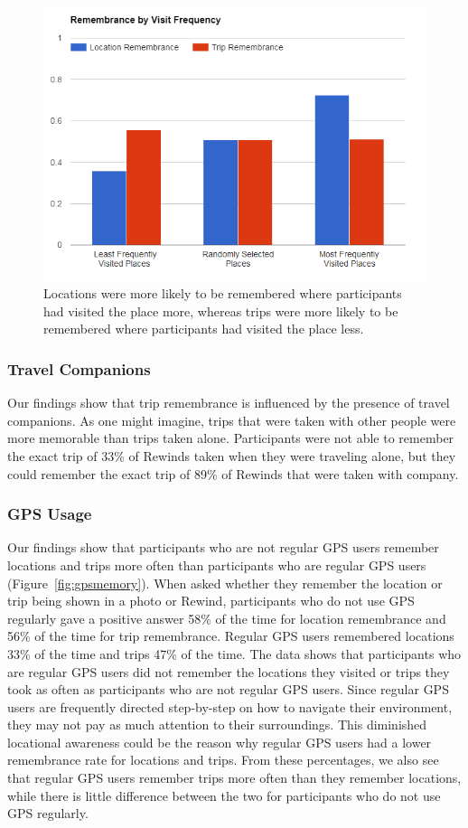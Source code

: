 \documentclass{sigchi}
\begin{document}
\begin{figure}
   \centering
     \includegraphics[width=1\linewidth]{RML_2}
     \caption{Locations were more likely to be remembered where participants had visited the place more, whereas trips were more likely to be remembered where participants had visited the place less.}
     \label{fig:frequencymemory}
\end{figure}

\subsubsection{Travel Companions}
Our findings show that trip remembrance is influenced by the presence of travel companions. As one might imagine, trips that were taken with other people were more memorable than trips taken alone. Participants were not able to remember the exact trip of 33\% of Rewinds taken when they were traveling alone, but they could remember the exact trip of 89\% of Rewinds that were taken with company.

\subsubsection{GPS Usage}
Our findings show that participants who are not regular GPS users remember locations and trips more often than participants who are regular GPS users (Figure~\ref{fig:gpsmemory}). When asked whether they remember the location or trip being shown in a photo or Rewind, participants who do not use GPS regularly gave a positive answer 58\% of the time for location remembrance and 56\% of the time for trip remembrance. Regular GPS users remembered locations 33\% of the time and trips 47\% of the time. The data shows that participants who are regular GPS users did not remember the locations they visited or trips they took as often as participants who are not regular GPS users. Since regular GPS users are frequently directed step-by-step on how to navigate their environment, they may not pay as much attention to their surroundings. This diminished locational awareness could be the reason why regular GPS users had a lower remembrance rate for locations and trips. From these percentages, we also see that regular GPS users remember trips more often than they remember locations, while there is little difference between the two for participants who do not use GPS regularly. 
\end{document}
